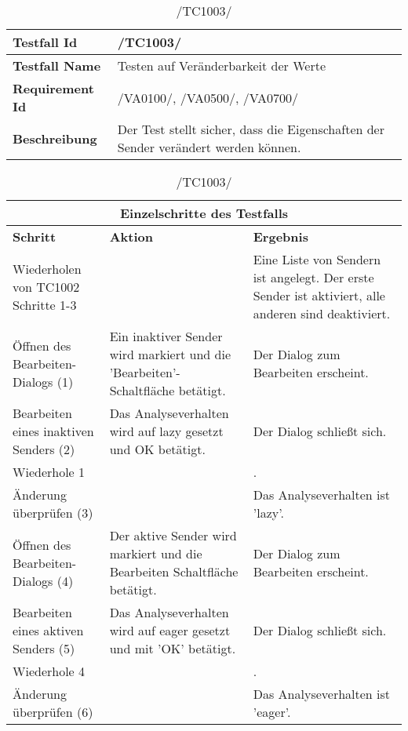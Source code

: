\begin{table}[h]
\caption{/TC1003/}
\label{tab:TC1003}
\begin{center}
\begin{tabular}{|p{3.5cm}|p{9cm}|}
\hline
\textbf{Testfall Id} & /TC1003/\\
\hline
\textbf{Testfall Name} & Testen auf Veränderbarkeit der Werte
\\
\hline
\textbf{Requirement Id} & /VA0100/, /VA0500/, /VA0700/\\
\hline
\textbf{Beschreibung} & Der Test stellt sicher, dass die Eigenschaften der
Sender verändert werden können.
\\
\hline
\end{tabular}
\begin{tabular}{|p{2.5cm}|p{5cm}|p{4.55cm}|}
\multicolumn{3}{|c|}{\textbf{Einzelschritte des Testfalls}} \\
\hline
\textbf{Schritt} & \textbf{Aktion} & \textbf{Ergebnis}\\
\hline
Wiederholen von TC1002 Schritte 1-3 & & Eine Liste von Sendern ist
 angelegt. Der erste Sender ist aktiviert, alle anderen sind deaktiviert.
\\
\hline
Öffnen des Bearbeiten-Dialogs (1) & Ein inaktiver Sender wird markiert und die
 'Bearbeiten'-Schaltfläche betätigt. & Der Dialog zum Bearbeiten erscheint.
 \\
\hline
Bearbeiten eines inaktiven Senders (2) & Das Analyseverhalten wird auf lazy 
gesetzt und OK betätigt. & Der Dialog schließt sich.
 \\
\hline
Wiederhole 1 & &.
\\
\hline
Änderung überprüfen (3) &  & Das Analyseverhalten ist 'lazy'.
\\
\hline
Öffnen des Bearbeiten-Dialogs (4) & Der aktive Sender wird markiert und die
 Bearbeiten Schaltfläche betätigt. & Der Dialog zum Bearbeiten erscheint.
\\
\hline
Bearbeiten eines aktiven Senders (5) & Das Analyseverhalten wird auf eager
gesetzt und mit 'OK' betätigt. & Der Dialog schließt sich.
\\
\hline
Wiederhole 4 & &.
\\
\hline
Änderung überprüfen (6) &  & Das Analyseverhalten ist 'eager'.
\\
\hline
\end{tabular}
\end{center}
\end{table}

